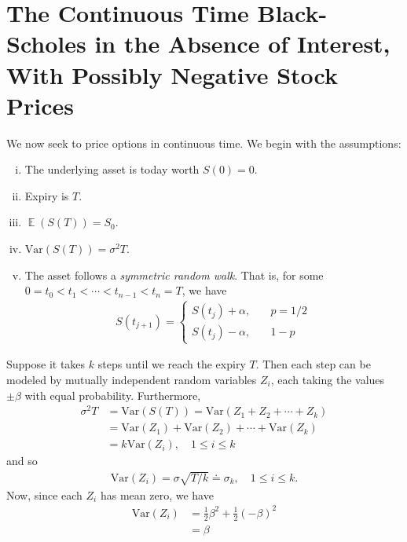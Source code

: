\documentclass[12pt]{article}
\DeclareMathOperator{\ex}{\mathbb{E}}
\newcommand{\var}{\mathrm{Var}}
\theoremstyle{plain}
\theoremstyle{definition}
\theoremstyle{remark}
\numberwithin{equation}{section}  %
\begin{document}
	\section{The Continuous Time Black-Scholes in the Absence of Interest,
	With Possibly Negative Stock Prices}
	We now seek to price options in continuous time. We begin with the assumptions:
	\begin{enumerate}[(i)]
		\item The underlying asset is today worth $S(0) = 0$.
		\item Expiry is $T$.
		\item $\ex(S(T)) = S_{0}$.
		\item $\var(S(T)) = \sigma^{2} T$.
		\item The asset follows a \emph{symmetric random walk}. That is,
			for some \\ $0=t_{0} < t_{1} < \cdots < t_{n-1} < t_{n} = T$, we have
			\begin{equation*}
				\begin{split}
					S(t_{j+1})  = \begin{cases}
						S(t_{j}) + \alpha, \quad & p = 1/2 \\
						S(t_{j}) - \alpha, \quad & 1-p
					\end{cases}
				\end{split}
			\end{equation*}
	\end{enumerate}
	Suppose it takes $k$ steps until we reach the expiry $T$. Then
	each step can be modeled by mutually independent random variables
	$Z_{i}$, each taking the values $\pm \beta$ with equal probability.
	Furthermore, 
	\begin{equation*}
		\begin{split}
			\sigma^{2} T
			& = \var(S(T)) = \var(Z_{1} + Z_{2} + \cdots + Z_{k})
			\\
			& = \var(Z_{1}) + \var(Z_{2}) + \cdots + \var(Z_{k})
			\\
			& = k \var(Z_{i}), \quad 1 \le i \le k
		\end{split}
	\end{equation*}
	and so
	\begin{equation*}
		\begin{split}
			\var(Z_{i}) = \sigma \sqrt{T/k} \doteq \sigma_{k}, \quad 1 \le i \le k.
		\end{split}
	\end{equation*}
	Now, since each $Z_{i}$ has mean zero, we have
	\begin{equation*}
		\begin{split}
			\var(Z_{i}) & = \frac{1}{2}\beta^{2} + \frac{1}{2}{(-\beta)}^{2}
			\\
			& = \beta
		\end{split}
	\end{equation*}
\end{document}
